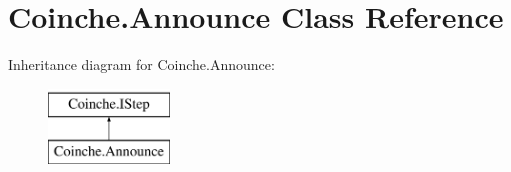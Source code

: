 \hypertarget{class_coinche_1_1_announce}{}\section{Coinche.\+Announce Class Reference}
\label{class_coinche_1_1_announce}
Inheritance diagram for Coinche.\+Announce\+:\begin{figure}[H]
\begin{center}
\leavevmode
\includegraphics[height=2.000000cm]{class_coinche_1_1_announce}
\end{center}
\end{figure}

